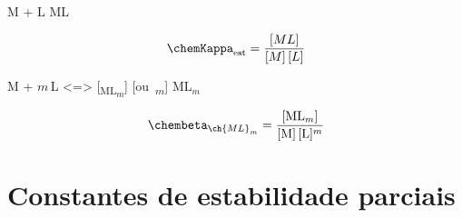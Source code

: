 \documentclass{article}
\renewcommand\arraystretch{1.25}	%
\begin{document}
{{\begin{multicols}{2}

\begin{tcolorbox}

\begin{center}\large\bfseries
	
	M + L 
	ML
	
\end{center}

\vspace{-6mm}

\begin{align*}
	\chemKappa_{\text{est}} 
= 	\frac{[ML]}
		{[M]\,[L]}
\end{align*}

\end{tcolorbox}

\begin{tcolorbox}

\begin{center}\large\bfseries

	M + $m$\,L
	\ch%
		{<=>%
		[\chembeta\textsubscript{ML\textsubscript{$m$}}]%
		[ou\ \chembeta\textsubscript{$m$}]
		}
	ML$_m$
	
\end{center}

\vspace{-6mm}

\begin{align*}
	\chembeta_{\ch{ML}_m}
=	\frac{[\text{ML}_m]}
		{[\text{M}]\,[\text{L}]^m}
\end{align*}

\end{tcolorbox}

\end{multicols}

\section{Constantes de estabilidade parciais}

{

\begin{table}[H]\centering
{}
\end{table}}}}
\end{document}
